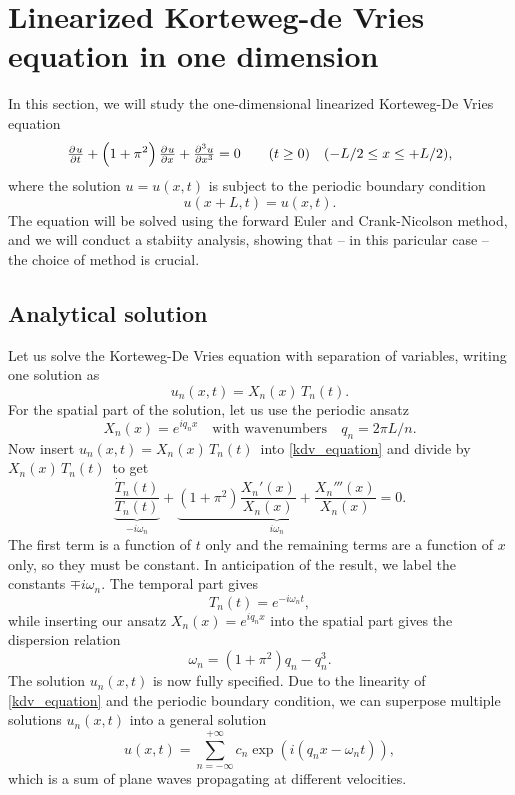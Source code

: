 \section{Linearized Korteweg-de Vries equation in one dimension}
\label{task4}

In this section, we will study the one-dimensional linearized Korteweg-De Vries equation
\begin{equation}
\pd{u}{t} + \left(1+\pi^2\right)\pd{u}{x} + \pd[3]{u}{x} = 0 \qquad (t \geq 0) \quad (-L/2 \leq x \leq +L/2),
\label{kdv_equation}
\end{equation}
where the solution $u = u(x,t)$ is subject to the periodic boundary condition
\begin{equation}
u(x+L, t) = u(x, t).
\label{ex5:eq:boundary_conditions}
\end{equation}
The equation will be solved using the forward Euler and Crank-Nicolson method, and we will conduct a stabiity analysis, showing that -- in this paricular case -- the choice of method is crucial.

\subsection{Analytical solution}

Let us solve the Korteweg-De Vries equation with separation of variables, writing one solution as
\begin{equation*}
	u_n(x,t) = X_n(x) \, T_n(t).
\end{equation*}
For the spatial part of the solution, let us use the periodic ansatz
\begin{equation*}
	X_n(x) = e^{i q_n x} \quad \text{with wavenumbers} \quad q_n = 2 \pi L / n.
\end{equation*}
Now insert $u_n(x,t) = X_n(x) \, T_n(t)$ into \cref{kdv_equation} and divide by $X_n(x) \, T_n(t)$ to get
\begin{equation*}
	\underbrace{\frac{\dot{T}_n(t)}{T_n(t)}}_{-i \omega_n} + \underbrace{\left( 1 + \pi^2 \right) \frac{X_n'(x)}{X_n(x)} + \frac{X_n'''(x)}{X_n(x)}}_{i \omega_n} = 0.
\end{equation*}
The first term is a function of $t$ only and the remaining terms are a function of $x$ only, so they must be constant.
In anticipation of the result, we label the constants $\mp i \omega_n$.
The temporal part gives
\begin{equation*}
	T_n(t) = e^{-i \omega_n t},
\end{equation*}
while inserting our ansatz $X_n(x) = e^{i q_n x}$ into the spatial part gives the dispersion relation
\begin{equation*}
	\omega_n = (1 + \pi^2) q_n - q_n^3.
\end{equation*}
The solution $u_n(x,t)$ is now fully specified.
Due to the linearity of \cref{kdv_equation} and the periodic boundary condition, we can superpose multiple solutions $u_n(x,t)$ into a general solution
\begin{equation}
	u(x,t) = \sum_{n=-\infty}^{+\infty} c_n \exp{\left( i(q_n x - \omega_n t) \right)},
	\label{fourier_series}
\end{equation}
which is a sum of plane waves propagating at different velocities.

